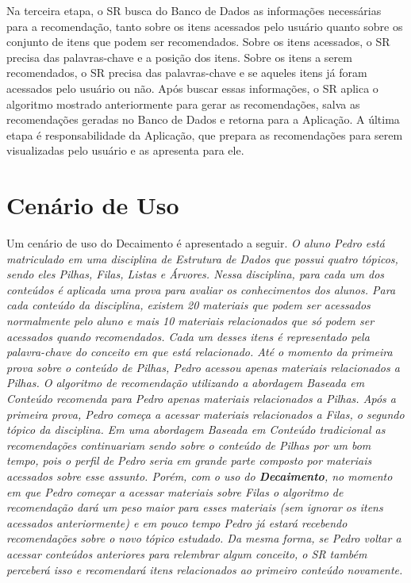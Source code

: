 Na terceira etapa, o SR busca do Banco de Dados as informações necessárias para a recomendação, tanto sobre os itens
acessados pelo usuário quanto sobre os conjunto de itens que podem ser recomendados. Sobre os itens acessados, o SR
precisa das palavras-chave e a posição dos itens. Sobre os itens a serem recomendados, o SR precisa das palavras-chave
e se aqueles itens já foram acessados pelo usuário ou não. Após buscar essas informações, o SR aplica o algoritmo
mostrado anteriormente para gerar as recomendações, salva as recomendações geradas no Banco de Dados e retorna para a
Aplicação. A última etapa é responsabilidade da Aplicação, que prepara as recomendações para serem visualizadas pelo
usuário e as apresenta para ele.

\section{Cenário de Uso}

Um cenário de uso do Decaimento é apresentado a seguir. \textit{O aluno Pedro está matriculado em uma disciplina de Estrutura de Dados
que possui quatro tópicos, sendo eles Pilhas, Filas, Listas e Árvores. Nessa disciplina, para cada um dos conteúdos é
aplicada uma prova para avaliar os conhecimentos dos alunos. Para cada conteúdo da disciplina, existem 20 materiais que podem
ser acessados normalmente pelo aluno e mais 10 materiais relacionados que só podem ser acessados quando recomendados.
Cada um desses itens é representado pela palavra-chave do conceito em que está relacionado. Até o momento da primeira prova sobre o conteúdo de Pilhas,
Pedro acessou apenas materiais relacionados a Pilhas. O algoritmo de recomendação utilizando a abordagem Baseada em
Conteúdo recomenda para Pedro apenas materiais relacionados a Pilhas. Após a primeira prova, Pedro começa a acessar
materiais relacionados a Filas, o segundo tópico da disciplina. Em uma abordagem Baseada em Conteúdo tradicional as
recomendações continuariam sendo sobre o conteúdo de Pilhas por um bom tempo, pois o perfil de Pedro seria em grande
parte composto por materiais acessados sobre esse assunto. Porém, com o uso do \textbf{Decaimento}, no momento em que Pedro começar a
acessar materiais sobre Filas o algoritmo de recomendação dará um peso maior para esses materiais (sem ignorar os itens
acessados anteriormente) e em pouco tempo Pedro já estará recebendo recomendações sobre o novo tópico estudado. Da mesma
forma, se Pedro voltar a acessar conteúdos anteriores para relembrar algum conceito, o SR também perceberá isso e
recomendará itens relacionados ao primeiro conteúdo novamente.}

